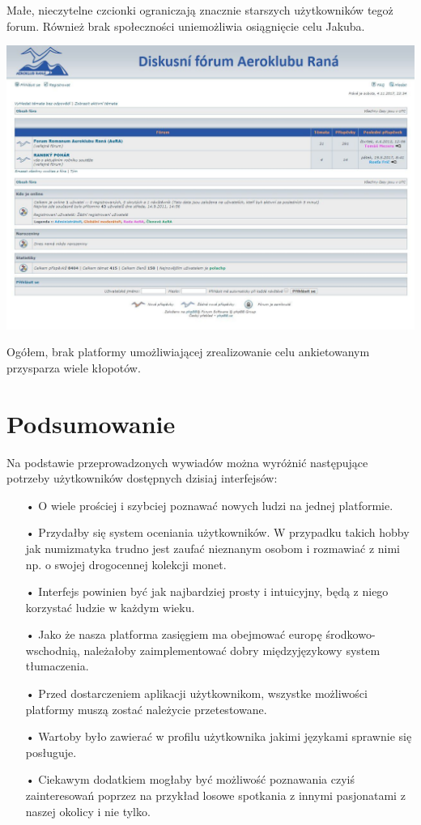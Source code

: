 \documentclass{article}
\begin{document}
\begin{enumerate}
Małe, nieczytelne czcionki ograniczają znacznie starszych użytkowników tegoż forum. Również brak społeczności uniemożliwia osiągnięcie celu Jakuba.
\begin{center}
\includegraphics[width=\textwidth]{7}
\end{center}
\end{enumerate}
Ogółem, brak platformy umożliwiającej zrealizowanie celu ankietowanym przysparza wiele kłopotów.
\newpage 
\section{Podsumowanie}
Na podstawie przeprowadzonych wywiadów można wyróżnić następujące potrzeby użytkowników dostępnych dzisiaj interfejsów:
\begin{itemize}
\item[•]O wiele prościej i szybciej poznawać nowych ludzi na jednej platformie.
\item[•]Przydałby się system oceniania użytkowników. W przypadku takich hobby jak numizmatyka trudno jest zaufać nieznanym osobom i rozmawiać z nimi np. o swojej drogocennej kolekcji monet.
\item[•]Interfejs powinien być jak najbardziej prosty i intuicyjny, będą z niego korzystać ludzie w każdym wieku.
\item[•]Jako że nasza platforma zasięgiem ma obejmować europę środkowo- wschodnią, należałoby zaimplementować dobry międzyjęzykowy system tłumaczenia. 
\item[•]Przed dostarczeniem aplikacji użytkownikom, wszystke możliwości platformy muszą zostać należycie przetestowane.
\item[•]Wartoby było zawierać w profilu użytkownika jakimi językami sprawnie się posługuje.
\item[•]Ciekawym dodatkiem mogłaby być możliwość poznawania czyiś zainteresowań poprzez na przykład losowe spotkania z innymi pasjonatami z naszej okolicy i nie tylko.
\end{itemize}
\end{document}
